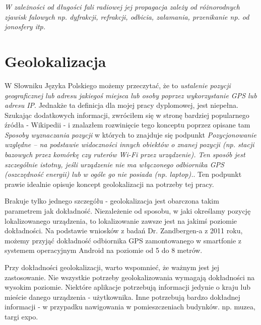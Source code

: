 \textit{W zależności od długości fali radiowej jej propagacja zależy od różnorodnych zjawisk falowych np. dyfrakcji, refrakcji, odbicia, załamania, przenikanie np. od jonosfery itp.}\cite{FaleRadioweWiki}






\section{Geolokalizacja}
W Słowniku Języka Polskiego możemy przeczytać, że to \textit{ustalenie pozycji geograficznej lub adresu jakiegoś miejsca lub osoby poprzez wykorzystanie GPS lub adresu IP}\cite{GeolokalizacjaSJP}. Jednakże ta definicja dla mojej pracy dyplomowej, jest niepełna. Szukając dodatkowych informacji, zwróciłem się w stronę bardziej popularnego źródła - Wikipedii - i znalazłem rozwinięcie tego konceptu poprzez opisane tam \textit{Sposoby wyznaczania pozycji} w których to znajduje się podpunkt \textit{Pozycjonowanie względne – na podstawie widoczności innych obiektów o znanej pozycji (np. stacji bazowych przez komórkę czy ruterów Wi-Fi przez urządzenie). Ten sposób jest szczególnie istotny, jeśli urządzenie nie ma włączonego odbiornika GPS (oszczędność energii) lub w ogóle go nie posiada (np. laptop).}\cite{GeolokalizacjaWiki}. Ten podpunkt prawie idealnie opisuje koncept geolokalizacji na potrzeby tej pracy. 

Brakuje tylko jednego szczegółu - geolokalizacja jest obarczona takim parametrem jak dokładność. Niezależenie od sposobu, w jaki określamy pozycję lokalizowanego urządzenia, to lokalizowanie zawsze jest na jakimś poziomie dokładności. Na podstawie wniosków z badań Dr. Zandbergen-a z 2011 roku, możemy przyjąć dokładność odbiornika GPS zamontowanego w smartfonie z systemem operacyjnym Android na poziomie od 5 do 8 metrów.\cite{GpsAccurancyZandbergen}

Przy dokładności geolokalizacji, warto wspomnieć, że ważnym jest jej zastosowanie. Nie wszystkie potrzeby geolokalizowania wymagają dokładności na wysokim poziomie. Niektóre aplikacje potrzebują informacji jedynie o kraju lub mieście danego urządzenia - użytkownika. Inne potrzebują bardzo dokładnej informacji - w przypadku nawigowania w pomieszczeniach budynków. np. muzea, targi expo. %

